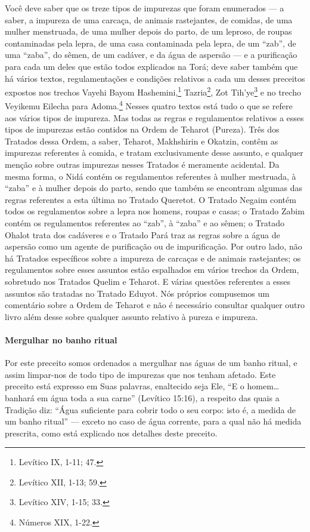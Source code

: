 Você deve saber que os treze tipos de impurezas que foram enumerados
--- a saber, a impureza de uma carcaça, de animais rastejantes, de
comidas, de uma mulher menstruada, de uma mulher depois do parto, de um
leproso, de roupas contaminadas pela lepra, de uma casa contaminada
pela lepra, de um ``zab'', de uma ``zaba'', do sêmen, de um cadáver, e
da água de aspersão --- e a purificação para cada um deles que estão
todos explicados na Torá; deve saber também que há vários textos, regulamentações e condições relativos a cada um desses preceitos expostos nos trechos Vayehi Bayom
Hashemini,\footnote{Levítico IX, 1-11; 47.} Tazria\footnote{Levítico XII, 1-13; 59.}, Zot
Tih'ye\footnote{Levítico XIV, 1-15; 33.} e no trecho Veyikemu Eilecha para
Adoma.\footnote{Números XIX, 1-22.}
Nesses quatro textos está tudo o que se refere aos vários tipos de
impureza. Mas todas as regras e regulamentos relativos a esses tipos de
impurezas estão contidos na Ordem de Teharot (Pureza). Três dos
Tratados dessa Ordem, a saber, Teharot, Makhshirin e Okatzin, contêm as
impurezas referentes à comida, e tratam exclusivamente desse assunto, e
qualquer menção sobre outras impurezas nesses Tratados é meramente
acidental. Da mesma forma, o Nidá contém os regulamentos referentes à
mulher mestruada, à ``zaba'' e à mulher depois do parto, sendo que
também se encontram algumas das regras referentes a esta última no
Tratado Queretot. O Tratado Negaim contém todos os regulamentos sobre a
lepra nos homens, roupas e casas; o Tratado Zabim contém os
regulamentos referentes ao ``zab'', à ``zaba'' e ao sêmen; o Tratado
Ohalot trata dos cadáveres e o Tratado Pará traz as regras sobre a água
de aspersão como um agente de purificação ou de impurificação. Por outro
lado, não há Tratados específicos sobre a impureza de carcaças e de
animais rastejantes; os regulamentos sobre esses assuntos estão
espalhados em vários trechos da Ordem, sobretudo nos Tratados Quelim e
Teharot. E várias questões referentes a esses assuntos são tratadas no
Tratado Eduyot. Nós próprios compusemos um comentário sobre a Ordem de
Teharot e não é necessário consultar qualquer outro livro além desse
sobre qualquer assunto relativo à pureza e impureza.

\paragraph{Mergulhar no banho ritual}

Por este preceito somos ordenados a mergulhar nas águas de um banho
ritual, e assim limpar-nos de todo tipo de impurezas que nos tenham
afetado. Este preceito está expresso em Suas palavras, enaltecido seja
Ele, ``E o homem\ldots{} banhará em água toda a sua carne'' (Levítico
15:16), a respeito das quais a Tradição diz: ``Água suficiente para
cobrir todo o seu corpo: isto é, a medida de um banho ritual'' ---
exceto no caso de água corrente, para a qual não há medida prescrita,
como está explicado nos detalhes deste preceito.

